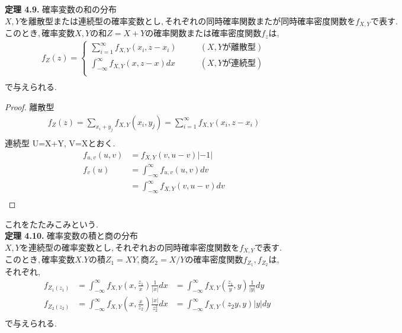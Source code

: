 \documentclass[dvipdfmx,10pt, a4j]{jarticle}
\theoremstyle{definition}
\begin{document}
\newpage
\noindent
\textbf{定理 4.9.} 確率変数の和の分布\\
$X, Yを離散型または連続型の確率変数とし, それぞれの同時確率関数またが同時確率密度関数をf_{X, Y}で表す.$
$このとき, 確率変数X, Yの和Z = X+Yの確率関数または確率密度関数f_zは,$\\
\begin{align*}
    f_Z(z) = 
    \begin{cases}
        \sum_{i=1}^{\infty}f_{X, Y}(x_i, z - x_i) \qquad &(X, Y が離散型)\\
        \int_{-\infty}^{\infty}f_{X, Y}(x, z - x)dx \qquad &(X, Y が連続型)\\
    \end{cases}\\
\end{align*}
で与えられる.\\
\begin{proof}
    離散型\\
    \begin{align*}
        f_Z(z) = \sum_{x_i + y_j} f_{X, Y} (x_i, y_j) = \sum_{i=1}^{\infty}f_{X, Y}(x_i, z-x_i)\\
    \end{align*}
    連続型 U=X+Y, V=Xとおく.\\
    \begin{align*}
        f_{u, v}(u, v) &= f_{X, Y}(v, u-v)|-1|\\
        f_v(u) &= \int_{-\infty}^{\infty}f_{u, v}(u, v)dv\\
        &= \int_{-\infty}^{\infty}f_{X, Y}(v, u-v)dv\\
    \end{align*}
\end{proof}
これをたたみこみという.\\

\noindent
\textbf{定理 4.10.} 確率変数の積と商の分布\\
$X, Yを連続型の確率変数とし, それぞれおの同時確率密度関数をf_{X, Y}で表す.$
$このとき, 確率変数X. Y の積 Z_1 = XY, 商Z_2 = X/Y の確率密度関数f_{Z_1}, f_{Z_2}は,$\\
それぞれ,\\
\begin{align*}
    &f_{Z_1(z_1)} &= \int_{-\infty}^{\infty}f_{X, Y}\left(x, \frac{z_1}{x}\right)\frac{1}{|x|}dx &= \int_{-\infty}^{\infty}f_{X, Y}\left(\frac{z_1}{y}, y \right)\frac{1}{|y|}dy\\
    &f_{Z_2(z_2)} &= \int_{-\infty}^{\infty}f_{X, Y}\left(x, \frac{x}{z_2}\right)\frac{|x|}{z_2^2}dx &= \int_{-\infty}^{\infty}f_{X, Y}\left(z_2y, y \right)|y|dy\\
\end{align*}
で与えられる.\\
\end{document}

